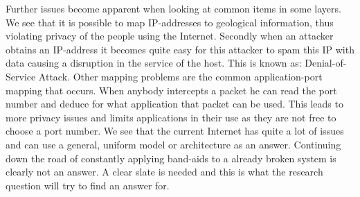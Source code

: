 \npar
Further issues become apparent when looking at common items in some layers. We see that it is possible to map IP-addresses to geological information, thus violating privacy of the people using the Internet. Secondly when an attacker obtains an IP-address it becomes quite easy for this attacker to spam this IP with data causing a disruption in the service of the host. This is known as: Denial-of-Service Attack. Other mapping problems are the common application-port mapping that occurs. When anybody intercepts a packet he can read the port number and deduce for what application that packet can be used. This leads to more privacy issues and limits applications in their use as they are not free to choose a port number. 
\npar
We see that the current Internet has quite a lot of issues and can use a general, uniform model or architecture as an answer. Continuing down the road of constantly applying band-aids to a already broken system is clearly not an answer. A clear slate is needed and this is what the research question will try to find an answer for. 

